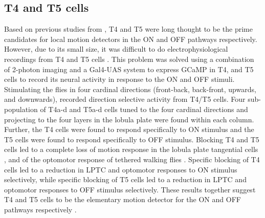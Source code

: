 \subsection{T4 and T5 cells}
Based on previous studies from \parencite{Fischbach1989, Buchner1984}, T4 and T5 were long thought to be the prime candidates for local motion detectors in the ON and OFF pathways respectively. However, due to its small size, it was difficult to do electrophysiological recordings from T4 and T5 cells \parencite{Douglass1996}. This problem was solved using a combination of 2-photon imaging and a Gal4-UAS system to express GCaMP in T4, and T5 cells to record its neural activity in response to the ON and OFF stimuli. Stimulating the flies in four cardinal directions (front-back, back-front, upwards, and downwards), \cite{Maisak2013} recorded direction selective activity from T4/T5 cells. Four sub-population of T4a-d and T5a-d cells tuned to the four cardinal directions and projecting to the four layers in the lobula plate were found within each column. Further, the T4 cells were found to respond specifically to ON stimulus and the T5 cells were found to respond specifically to OFF stimulus. Blocking T4 and T5 cells led to a complete loss of motion response in the lobula plate tangential cells \parencite{Schnell2012}, and of the optomotor response of tethered walking flies \parencite{Bahl2013}. Specific blocking of T4 cells led to a reduction in LPTC and optomotor responses to ON stimulus selectively, while specific blocking of T5 cells led to a reduction in LPTC and optomotor responses to OFF stimulus selectively. These results together suggest T4 and T5 cells to be the elementary motion detector for the ON and OFF pathways respectively \parencite{Maisak2013}.      

